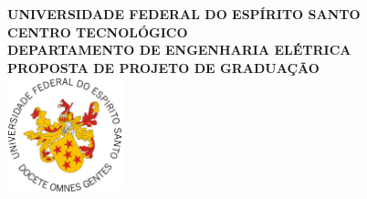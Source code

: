\documentclass[
	12pt,				%
	openright,			%
	oneside,			%
	a4paper,			%
	chapter=TITLE,		%
	section=TITLE,		%
	english,			%
	french,				%
	spanish,			%
	brazil				%
	]{abntex2}
\newcommand{\universidade}{Universidade Federal do Espírito Santo}
\newcommand{\centro}{Centro Tecnológico}
\newcommand{\departamento}{Departamento de Engenharia Elétrica}
\newcommand{\disciplina}{Proposta de Projeto de Graduação}
\newcommand{\imprimirINSTITUICAO}{
	\MakeUppercase{\universidade} \\
	\MakeUppercase{\centro} \\
	\MakeUppercase{\departamento} \\
	\MakeUppercase{\disciplina} \\
}
\begin{document}

\frenchspacing 


\renewcommand{\imprimircapa}{%
	\begin{capa}%
		\center
		{\ABNTEXchapterfont\bfseries\large\imprimirINSTITUICAO}
			\vspace*{1.5cm}
		\includegraphics*[width=0.25\textwidth]{brasao_ufes.jpg}
			\vspace*{1.5cm} \\
		{\ABNTEXchapterfont\Large\imprimirautor}
				\vspace*{2.5cm} \\
		{\ABNTEXchapterfont\bfseries\Large\imprimirtitulo}
			\vfill
			\vspace*{0.5cm}
		{\large\imprimirlocal}
		\par
		{\large\imprimirdata}
			\vspace*{1cm}
	\end{capa}
}

\imprimircapa

\end{document}
